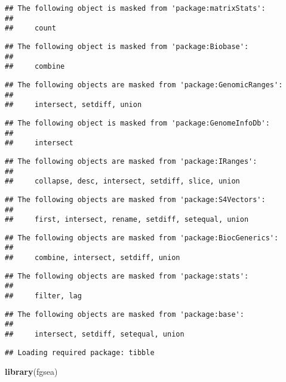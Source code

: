 \documentclass[]{article}
\newenvironment{Shaded}{\begin{snugshade}}{\end{snugshade}}
\newcommand{\KeywordTok}[1]{\textcolor[rgb]{0.13,0.29,0.53}{\textbf{#1}}}
\newcommand{\NormalTok}[1]{#1}
\begin{document}
\begin{verbatim}
## The following object is masked from 'package:matrixStats':
## 
##     count
\end{verbatim}

\begin{verbatim}
## The following object is masked from 'package:Biobase':
## 
##     combine
\end{verbatim}

\begin{verbatim}
## The following objects are masked from 'package:GenomicRanges':
## 
##     intersect, setdiff, union
\end{verbatim}

\begin{verbatim}
## The following object is masked from 'package:GenomeInfoDb':
## 
##     intersect
\end{verbatim}

\begin{verbatim}
## The following objects are masked from 'package:IRanges':
## 
##     collapse, desc, intersect, setdiff, slice, union
\end{verbatim}

\begin{verbatim}
## The following objects are masked from 'package:S4Vectors':
## 
##     first, intersect, rename, setdiff, setequal, union
\end{verbatim}

\begin{verbatim}
## The following objects are masked from 'package:BiocGenerics':
## 
##     combine, intersect, setdiff, union
\end{verbatim}

\begin{verbatim}
## The following objects are masked from 'package:stats':
## 
##     filter, lag
\end{verbatim}

\begin{verbatim}
## The following objects are masked from 'package:base':
## 
##     intersect, setdiff, setequal, union
\end{verbatim}

\begin{verbatim}
## Loading required package: tibble
\end{verbatim}

\begin{Shaded}
\begin{Highlighting}[]
\KeywordTok{library}\NormalTok{(fgsea)}
\end{Highlighting}
\end{Shaded}
\end{document}
